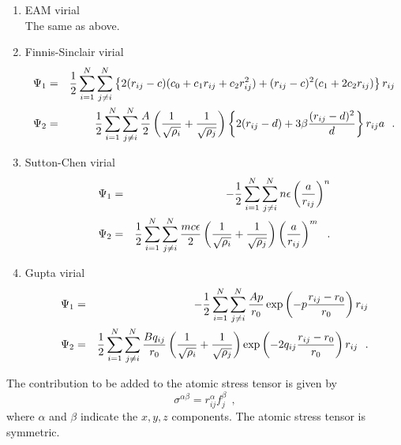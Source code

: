 \begin{enumerate}
\item EAM virial \\
The same as above.
\item Finnis-Sinclair virial
\begin{eqnarray}
\Psi_{1} &=& {1 \over 2} \sum_{i=1}^{N} \sum_{j \ne i}^{N}
\left\{ 2 (r_{ij}-c) (c_{0}+c_{1}r_{ij}+c_{2}r_{ij}^{2}) +
(r_{ij}-c)^{2} (c_{1}+2c_{2}r_{ij}) \right\} r_{ij} \nonumber \\
\Psi_{2} &=& {1 \over 2} \sum_{i=1}^{N} \sum_{j \ne i}^{N}
{A \over 2} \left( \frac{1}{\sqrt{\rho_{i}}} + \frac{1}{\sqrt{\rho_{j}}} \right) 
\left\{ 2(r_{ij}-d) + 3 \beta \frac{(r_{ij}-d)^{2}}{d} \right\} r_{ij}a~~.
\end{eqnarray}
\item Sutton-Chen virial
\begin{eqnarray}
\Psi_{1} &=& -{1 \over 2} \sum_{i=1}^{N} \sum_{j \ne i}^{N} n \epsilon \left( \frac{a}{r_{ij}} \right)^{n} \nonumber \\
\Psi_{2} &=& {1 \over 2} \sum_{i=1}^{N} \sum_{j \ne i}^{N} \frac{m c
  \epsilon}{2} 
\left( \frac{1}{\sqrt{\rho_{i}}} + \frac{1}{\sqrt{\rho_{j}}} \right) 
\left( \frac{a}{r_{ij}} \right)^{m}~~.
\end{eqnarray}
\item Gupta virial
\begin{eqnarray}
\Psi_{1} &=& -{1 \over 2} \sum_{i=1}^{N} \sum_{j \ne i}^{N}
\frac{A p}{r_{0}} \exp \left( -p \frac{r_{ij}-r_{0}}{r_{0}} \right) r_{ij} \nonumber \\
\Psi_{2} &=& {1 \over 2} \sum_{i=1}^{N} \sum_{j \ne i}^{N} \frac{B q_{ij}}{r_{0}}
\left( \frac{1}{\sqrt{\rho_{i}}} + \frac{1}{\sqrt{\rho_{j}}} \right) 
\exp \left( -2 q_{ij} \frac{r_{ij}-r_{0}}{r_{0}} \right) r_{ij}~~.
\end{eqnarray}
\end{enumerate}

The contribution to be added to the atomic stress tensor is
given by
\begin{equation}
\sigma^{\alpha \beta} = r_{ij}^{\alpha} f_{j}^{\beta}~~,
\end{equation}
where $\alpha$ and $\beta$ indicate the $x,y,z$ components.  The
atomic stress tensor is symmetric.


